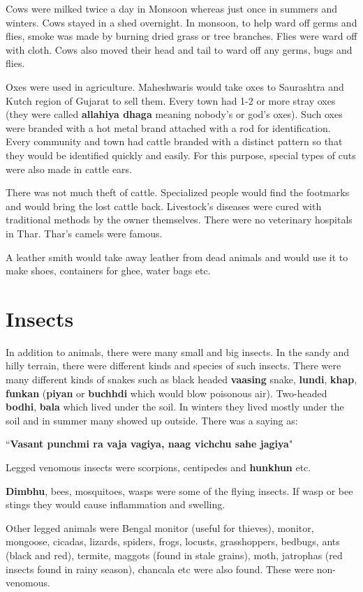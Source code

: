 Cows were milked twice a day in Monsoon whereas just once in summers and
winters. Cows stayed in a shed overnight. In monsoon, to help ward off germs
and flies, smoke was made by burning dried grass or tree branches. Flies were
ward off with cloth. Cows also moved their head and tail to ward off any germs,
bugs and flies.

Oxes were used in agriculture. Maheshwaris would take oxes to Saurashtra and
Kutch region of Gujarat to sell them. Every town had 1-2 or more stray oxes
(they were called \textbf{allahiya dhaga} meaning nobody's or god's oxes). Such
oxes were branded with a hot metal brand attached with a rod for
identification. Every community and town had cattle branded with a distinct
pattern so that they would be identified quickly and easily. For this purpose,
special types of cuts were also made in cattle ears.

There was not much theft of cattle. Specialized people would find the
footmarks and would bring the lost cattle back. Livestock's diseases were cured
with traditional methods by the owner themselves. There were no veterinary
hospitals in Thar. Thar's camels were famous.

A leather smith would take away leather from dead animals and would use it to
make shoes, containers for ghee, water bags etc.

\section{Insects}
In addition to animals, there were many small and big insects. In the sandy and
hilly terrain, there were different kinds and species of such insects. There
were many different kinds of snakes such as black headed \textbf{vaasing}
snake, \textbf{lundi}, \textbf{khap}, \textbf{funkan} (\textbf{piyan} or
\textbf{buchhdi} which would blow poisonous air). Two-headed \textbf{bodhi},
\textbf{bala} which lived under the soil. In winters they lived mostly under
the soil and in summer many showed up outside. There was a saying as:

``\textbf{Vasant punchmi ra vaja vagiya, naag vichchu sahe jagiya}"

Legged venomous insects were scorpions, centipedes and \textbf{hunkhun} etc.

\textbf{Dimbhu}, bees, mosquitoes, wasps were some of the flying insects. If
wasp or bee stings they would cause inflammation and swelling. 

Other legged animals were Bengal monitor (useful for thieves), monitor,
mongoose, cicadas, lizards, spiders, frogs, locusts, grasshoppers, bedbugs,
ants (black and red), termite, maggots (found in stale grains), moth, jatrophas
(red insects found in rainy season), chancala etc were also found. These were
non-venomous.

